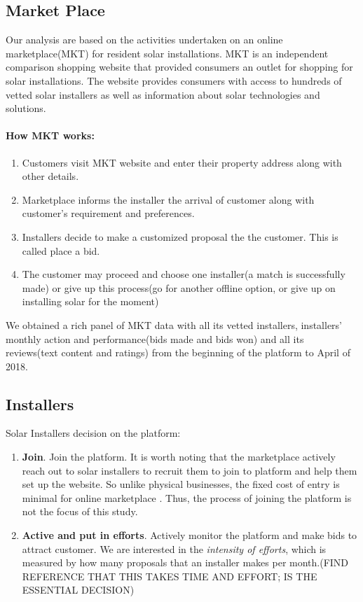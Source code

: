 \documentclass[msom,blindrev]{informs3}
\begin{document}
\subsection{Market Place}
Our analysis are based on the activities undertaken on an online marketplace(MKT) for resident solar installations. MKT is an independent comparison shopping website that provided consumers an outlet for shopping for solar installations. The website provides consumers with access to hundreds of vetted solar installers as well as information about solar technologies and solutions.

\paragraph{How MKT works:}
\begin{enumerate}
\item Customers visit MKT website and enter their property address along with other details.
\item Marketplace informs the installer the arrival of customer along with customer's requirement and preferences.
\item Installers decide to make a customized proposal the the customer. This is called place a bid.
\item The customer may proceed and choose one installer(a match is successfully made) or give up this process(go for another offline option, or give up on installing solar for the moment)
\end{enumerate}

We obtained a rich panel of MKT data with all its vetted installers, installers' monthly action and performance(bids made and bids won) and all its reviews(text content and ratings) from the beginning of the platform to April of 2018.

\subsection{Installers}
Solar Installers decision on the platform:

\begin{enumerate}
\item  \textbf{Join}. Join the platform. It is worth noting that the marketplace actively reach out to solar installers to recruit them to join to platform and help them set up the website. So unlike physical businesses, the fixed cost of entry is minimal for online marketplace \citep{haddad2015consumer}. Thus, the process of joining the platform is not the focus of this study. \\
\item  \textbf{Active and put in efforts}. Actively monitor the platform and make bids to attract customer. We are interested in the\textit{ intensity of efforts}, which is measured by how many proposals that an installer makes per month.(FIND REFERENCE THAT THIS TAKES TIME AND EFFORT; IS THE ESSENTIAL DECISION)\\
\end{enumerate}
\end{document}
